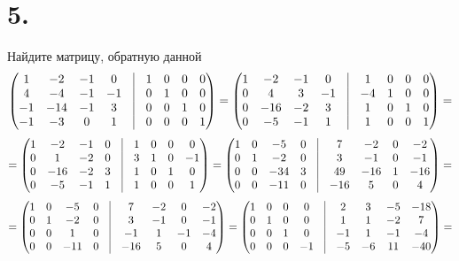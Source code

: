 \documentclass[a4paper,12pt]{article}
\begin{document}
\section*{5.}
Найдите матрицу, обратную данной
\[
\begin{pmatrix}
1 & -2 & -1 & 0 & \vrule & 1 & 0 & 0 & 0\\
4 & -4 &-1 & -1 & \vrule & 0 & 1  & 0 &0\\
-1 & -14 & -1 & 3 & \vrule & 0 & 0 & 1 & 0\\
-1 & -3 & 0 & 1 & \vrule & 0 & 0 & 0 & 1\\
\end{pmatrix} =
\begin{pmatrix}
1 & -2 & -1 & 0 & \vrule & 1 & 0 & 0 & 0\\
0 & 4&3& -1 & \vrule & -4& 1  & 0 &0\\
0 & -16 & -2& 3 & \vrule & 1 & 0 & 1 & 0\\
0 & -5 & -1 & 1 & \vrule & 1 & 0 & 0 & 1\\
\end{pmatrix} =
\]
\[
= 
\begin{pmatrix}
1 & -2 & -1 & 0 & \vrule & 1 & 0 & 0 & 0\\
0 &1&-2& 0 & \vrule & 3& 1  & 0 &-1\\
0 & -16 & -2& 3 & \vrule & 1 & 0 & 1 & 0\\
0 & -5 & -1 & 1 & \vrule & 1 & 0 & 0 & 1\\
\end{pmatrix} =
\begin{pmatrix}
1 & 0 & -5& 0 & \vrule & 7& -2& 0 & -2\\
0 & 1&-2& 0& \vrule & 3& -1  & 0 &-1\\
0 & 0& -34& 3 & \vrule & 49& -16 & 1 & -16\\
0 & 0& -11 & 0 & \vrule & -16& 5 & 0 & 4\\
\end{pmatrix} =
\]
\[
=
\begin{pmatrix}
1 & 0 & -5& 0 & \vrule & 7& -2& 0 & -2\\
0 & 1&-2& 0& \vrule & 3& -1  & 0 &-1\\
0 & 0& 1& 0 & \vrule & -1& 1 & -1& -4\\
0 & 0& -11 & 0 & \vrule & -16& 5 & 0 & 4\\
\end{pmatrix} =
\begin{pmatrix}
1 & 0 & 0& 0 & \vrule & 2& 3& -5 & -18\\
0 & 1&0& 0& \vrule & 1& 1  & -2&7\\
0 & 0& 1& 0 & \vrule & -1& 1 & -1& -4\\
0 & 0& 0& -1& \vrule & -5& -6 & 11 & -40\\
\end{pmatrix} =
\]
\end{document}
